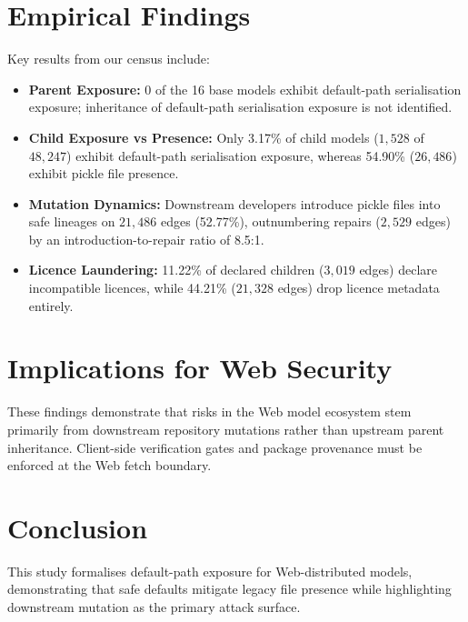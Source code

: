 \documentclass[sigconf,anonymous,review]{acmart}
\begin{document}
\section{Empirical Findings}
Key results from our census include:
\begin{itemize}
    \item \textbf{Parent Exposure:} 0 of the 16 base models exhibit default-path serialisation exposure; inheritance of default-path serialisation exposure is not identified.
    \item \textbf{Child Exposure vs Presence:} Only 3.17\% of child models ($1{,}528$ of $48{,}247$) exhibit default-path serialisation exposure, whereas 54.90\% ($26{,}486$) exhibit pickle file presence.
    \item \textbf{Mutation Dynamics:} Downstream developers introduce pickle files into safe lineages on $21{,}486$ edges (52.77\%), outnumbering repairs ($2{,}529$ edges) by an introduction-to-repair ratio of 8.5:1.
    \item \textbf{Licence Laundering:} 11.22\% of declared children ($3{,}019$ edges) declare incompatible licences, while 44.21\% ($21{,}328$ edges) drop licence metadata entirely.
\end{itemize}

\section{Implications for Web Security}
These findings demonstrate that risks in the Web model ecosystem stem primarily from downstream repository mutations rather than upstream parent inheritance. Client-side verification gates and package provenance must be enforced at the Web fetch boundary.

\section{Conclusion}
This study formalises default-path exposure for Web-distributed models, demonstrating that safe defaults mitigate legacy file presence while highlighting downstream mutation as the primary attack surface.



\end{document}
